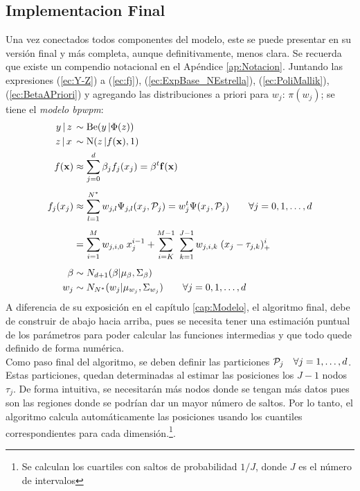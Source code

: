 \documentclass[../Main/Main.tex]{subfiles}
\begin{document}
\subsection{Implementacion Final}
Una vez conectados todos componentes del modelo, este se puede presentar en su versión final y más completa, aunque definitivamente, menos clara. Se recuerda que existe un compendio notacional en el Apéndice \ref{ap:Notacion}. Juntando las expresiones (\ref{ec:Y-Z}) a (\ref{ec:fj}), (\ref{ec:ExpBase_NEstrella}), (\ref{ec:PoliMallik}), (\ref{ec:BetaAPriori}) y agregando las distribuciones a priori para $w_j$: $\pi(w_j)$; se tiene el \textit{modelo bpwpm}:
\begin{align}
	y\,|\,z\, &\sim \text{Be}(y\,|\Phi(z)) \nonumber\\ 
	z\,|\,x\, &\sim \text{N}(z\,|f(\xsn),1)\nonumber \\
	f(\xsn) &\approx \sum_{j=0}^d \beta_j f_j(x_j) 
			= \beta^t\fsn(\xsn)  \nonumber\\[4pt]
	f_j(x_j)&\approx \sum_{l = 1}^{\N} w_{j,l} \Psi_{j,l}(x_j, \mathcal{P}_j) 				=  w_j^t\Psi(x_j,\P_j) \quad\quad \forall j= 0,1,\ldots,d
			\nonumber\\[4pt]
 		 	&=	\sum_{i = 1}^M w_{j,i,0} \; x_j^{i-1} + 
			\sum_{i = K}^{M-1} \;
	 		\sum_{k = 1}^{J-1}w_{j,i,k}\;(x_j - \t_{j,k})_+^{i} 
			\nonumber \\[4pt]	 					
	 		\beta &\sim N_{d+1}(\beta|\mu_{\beta}, \Sigma_{\beta})	\nonumber \\
	w_j  &\sim N_{\N}(w_j|\mu_{w_j},\Sigma_{w_j}) \quad\quad \forall j= 0,1,\ldots,d \label{ec:ModBPWPM}
\end{align}
A diferencia de su exposición en el capítulo \ref{cap:Modelo}, el algoritmo final, debe de construir de abajo hacia arriba, pues se necesita tener una estimación puntual de los parámetros para poder calcular las funciones intermedias y que todo quede definido de forma numérica.\\

Como paso final del algoritmo, se deben definir las particiones $\P_j \quad \forall j= 1,\ldots,d$. Estas particiones, quedan determinadas al estimar las posiciones los $J-1$ nodos $\tau_j$. De forma intuitiva, se necesitarán más nodos donde se tengan más datos pues son las regiones donde se podrían dar un mayor número de saltos. Por lo tanto, el algoritmo calcula automáticamente las posiciones usando los cuantiles correspondientes para cada dimensión.\footnote{Se calculan los cuartiles con saltos de probabilidad $1/J$, donde $J$ es el número de intervalos}.\\ 
\end{document}
